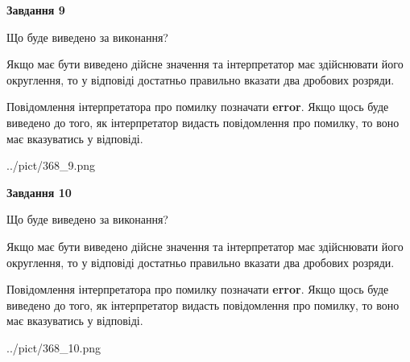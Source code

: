 \documentclass[12pt, ukrainian]{article}
\begin{document}
{\begin {Large}
{\begin {center}\textbf{Завдання 9}\end {center}}\par
Що буде виведено за виконання? \par

Якщо має бути виведено дійсне значення та інтерпретатор має здійснювати його округлення, 
то у відповіді достатньо правильно вказати два дробових розряди.

Повідомлення інтерпретатора про помилку позначати \textbf{error}.
Якщо щось буде виведено до того, як інтерпретатор видасть повідомлення про помилку, 
то воно має вказуватись у відповіді. \par

\begin{center}
	{../pict/368_9.png}
\end{center}
\newpage

{\begin {center}\textbf{Завдання 10}\end {center}}\par
Що буде виведено за виконання? \par

Якщо має бути виведено дійсне значення та інтерпретатор має здійснювати його округлення, 
то у відповіді достатньо правильно вказати два дробових розряди.

Повідомлення інтерпретатора про помилку позначати \textbf{error}.
Якщо щось буде виведено до того, як інтерпретатор видасть повідомлення про помилку, 
то воно має вказуватись у відповіді. \par

\begin{center}
	{../pict/368_10.png}
\end{center}
\newpage

\end {Large}}
\end{document}
